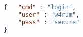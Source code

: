 \documentclass[aspectratio=0510]{beamer}
\begin{document}
    \begin{lstlisting}[language=json,firstnumber=1]
{   "cmd" : "login",
    "user" : "w4rum",
    "pass" : "secure"
}
    \end{lstlisting}
\end{document}
